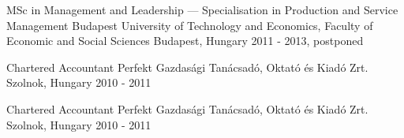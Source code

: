 


\begin{cventries}


  \cventry
    {MSc in Management and Leadership — Specialisation in Production and Service Management} %
    {Budapest University of Technology and Economics, Faculty of Economic and Social Sciences} %
    {Budapest, Hungary} %
    {2011 - 2013, postponed} %
    {
    }


  \cventry
    {Chartered Accountant} %
    {Perfekt Gazdasági Tanácsadó, Oktató és Kiadó Zrt.} %
    {Szolnok, Hungary} %
    {2010 - 2011} %
    {
    }


  \cventry
    {Chartered Accountant} %
    {Perfekt Gazdasági Tanácsadó, Oktató és Kiadó Zrt.} %
    {Szolnok, Hungary} %
    {2010 - 2011} %
    {
    }


\end{cventries}
